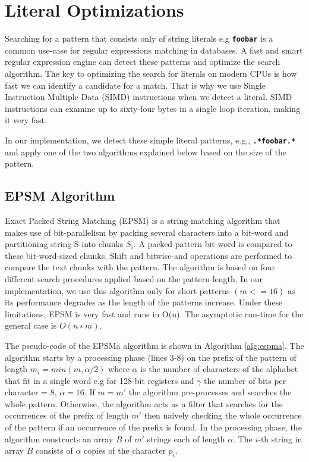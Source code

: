 \section{Literal Optimizations}\label{section:simdopt}
Searching for a pattern that consists only of string literals e.g \texttt{\textbf{foobar}} is a common use-case for regular expressions matching in databases. A fast and smart regular expression engine can detect these patterns and optimize the search algorithm. The key to optimizing the search for literals on modern CPUs is how fast we can identify a candidate for a match. That is why we use Single Instruction Multiple Data (SIMD) instructions when we detect a literal. SIMD instructions can examine up to sixty-four bytes in a single loop iteration, making it very fast.

In our implementation, we detect these simple literal patterns, e.g., \texttt{\textbf{.*foobar.*}} and apply one of the two algorithms explained below based on the size of the pattern.

\subsection{EPSM Algorithm}
Exact Packed String Matching (EPSM) \cite{epsm} is a string matching algorithm that makes use of bit-parallelism by packing several characters into a bit-word and partitioning string S into chunks $S_i$. A packed pattern bit-word is compared to these bit-word-sized chunks. Shift and bitwise-and operations are performed to compare the text chunks with the pattern. The algorithm is based on four different search procedures applied based on the pattern length. In our implementation, we use this algorithm only for short patterns $(m <= 16)$ as its performance degrades as the length of the patterns increase. Under these limitations, EPSM is very fast and runs in O(n). The asymptotic run-time for the general case is $O(n ∗ m)$.

The pseudo-code of the EPSMa algorithm is shown in Algorithm \ref{alg:espma}. The algorithm starts by a processing phase (lines 3-8) on the prefix of the pattern of length $m_i = min(m, \alpha/2)$ where $\alpha$ is the number of characters of the alphabet that fit in a single word e.g for 128-bit registers and $\gamma$ the number of bits per character = 8, $\alpha = 16$. If $m = m'$ the algorithm pre-processes and searches the whole pattern. Otherwise, the algorithm acts as a filter that searches for the occurrences of the prefix of length $m'$ then naively checking the whole occurrence of the pattern if an occurrence of the prefix is found. In the processing phase, the algorithm  constructs an array $B$ of $m'$ strings each of length $\alpha$. The $i$-th string in array $B$ consists of $\alpha$ copies of the character $p_i$.

